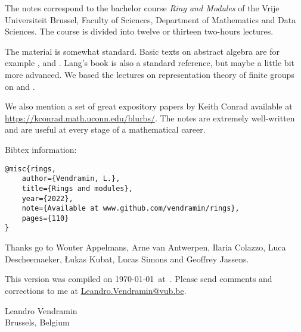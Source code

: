 \preface

The notes correspond to the bachelor 
course \emph{Ring and Modules} of the 
Vrije Universiteit Brussel, 
Faculty of Sciences, 
Department of Mathematics and Data Sciences. The course
is divided into twelve or thirteen two-hours lectures. 

The material is somewhat standard. Basic texts on abstract algebra
are for example \cite{MR1129886}, \cite{MR2286236} and \cite{MR600654}. 
Lang's book \cite{MR783636} is also a standard reference, but 
maybe a little bit more advanced. 
We based the lectures on representation theory of finite
groups on \cite{MR0450380} and 
\cite{MR2867444}. 

We also mention a set of great expository papers by 
Keith Conrad available at 
\url{https://kconrad.math.uconn.edu/blurbs/}. 
The notes are extremely well-written and are useful at  
every stage of a mathematical career. 

Bibtex information:
{\footnotesize\begin{verbatim}
@misc{rings,
    author={Vendramin, L.},
    title={Rings and modules},
    year={2022},
    note={Available at www.github.com/vendramin/rings},
    pages={110}
}
\end{verbatim}}

 Thanks go to Wouter Appelmans, Arne van Antwerpen, Ilaria Colazzo, Luca Descheemaeker, {\L}ukas Kubat, Lucas Simons
and Geoffrey Jassens. 

This version 
was compiled on \today~at~\currenttime. 
Please send comments and corrections to me at \url{Leandro.Vendramin@vub.be}. 


\bigskip
\begin{flushright}
Leandro Vendramin\\Brussels, Belgium\par
\end{flushright}

